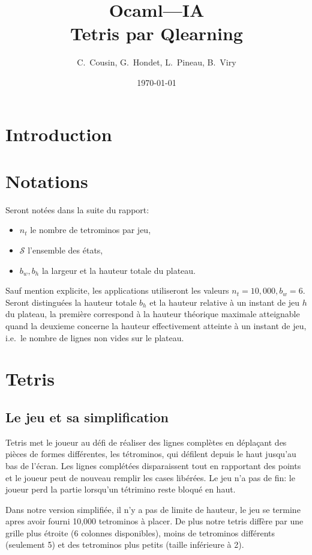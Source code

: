 \documentclass{report}
\title{Ocaml---IA\\Tetris par Qlearning}
\author{C.~Cousin, G.~Hondet, L.~Pineau, B.~Viry}
\date{\today}
\begin{document}
\maketitle
\tableofcontents

\chapter*{Introduction}

\chapter*{Notations}
Seront notées dans la suite du rapport:
\begin{itemize}
  \item \(n_t\) le nombre de tetrominos par jeu,
  \item \(\mathcal{S}\) l'ensemble des états,
  \item \(b_w, b_h\) la largeur et la hauteur totale du plateau.
\end{itemize}
Sauf mention explicite, les applications utiliseront les valeurs \(n_t=10,000,
b_w = 6\). Seront distingu\'ees la hauteur totale \(b_h\) et la hauteur relative
à un instant de jeu \(h\) du plateau, la première correspond à la hauteur
théorique maximale atteignable quand la deuxieme concerne la hauteur
effectivement atteinte à un instant de jeu, i.e.\ le nombre de lignes non vides
sur le plateau.

\chapter{Tetris}

\section{Le jeu et sa simplification}
Tetris met le joueur au défi de réaliser des lignes complètes en déplaçant des
pièces de formes différentes, les tétrominos, qui défilent depuis le haut
jusqu'au bas de l'écran. Les lignes complétées disparaissent tout en rapportant
des points et le joueur peut de nouveau remplir les cases libérées. Le jeu
n'a pas de fin: le joueur perd la partie lorsqu'un tétrimino reste bloqué en
haut.

Dans notre version simplifiée, il n'y a pas de limite de hauteur, le jeu se
termine apres avoir fourni 10,000 tetrominos à placer. De plus notre
tetris diffère par une grille plus étroite (6 colonnes disponibles), moins de
tetrominos différents (seulement 5) et des tetrominos plus petits (taille
inférieure à 2).
\end{document}
